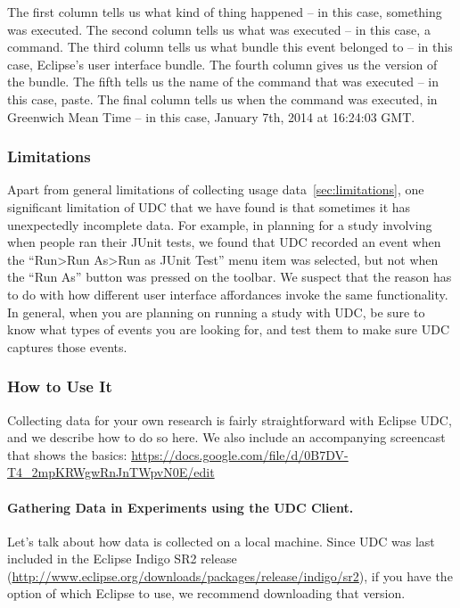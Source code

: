 \vspace{4mm}
The first column tells us what kind of thing happened -- in this case, something was executed.
The second column tells us what was executed -- in this case, a command.
The third column tells us what bundle this event belonged to -- in this case, Eclipse's user interface bundle.
The fourth column gives us the version of the bundle.
The fifth tells us the name of the command that was executed -- in this case, paste.
The final column tells us when the command was executed, in Greenwich Mean Time -- in this case, January 7th, 2014 at 16:24:03 GMT.


\subsubsection{Limitations}

Apart from general limitations of collecting usage data~\ref{sec:limitations},
one significant limitation of UDC that we have found is that sometimes it has 
unexpectedly incomplete data.
For example, in planning for a study involving when people ran their JUnit tests,
we found that UDC recorded an event when the ``Run>Run As>Run as JUnit Test'' menu item was selected,
but not when the ``Run As'' button was pressed on the toolbar.
We suspect that the reason has to do with how different user interface affordances 
invoke the same functionality.
In general, when you are planning on running a study with UDC, be sure to know what 
types of events you are looking for, and test them to make sure UDC captures those events.

\subsubsection{How to Use It}

Collecting data for your own research is fairly straightforward with Eclipse UDC,
and we describe how to do so here.
We also include an accompanying screencast that shows the basics: 
\url{https://docs.google.com/file/d/0B7DV-T4_2mpKRWgwRnJnTWpvN0E/edit}

\paragraph{Gathering Data in Experiments using the UDC Client.}

Let's talk about how data is collected on a local machine.
Since UDC was last included in the Eclipse Indigo SR2 release 
(\url{http://www.eclipse.org/downloads/packages/release/indigo/sr2}), 
if you have the option of which Eclipse to use, we recommend downloading
that version.

